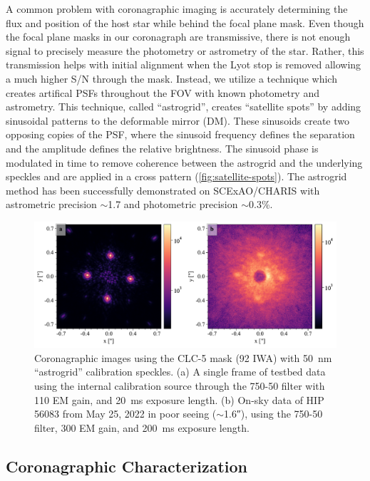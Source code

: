 \documentclass[]{spie}  %
\begin{document}
A common problem with coronagraphic imaging is accurately determining the flux and position of the host star while behind the focal plane mask. Even though the focal plane masks in our coronagraph are transmissive, there is not enough signal to precisely measure the photometry or astrometry of the star. Rather, this transmission helps with initial alignment when the Lyot stop is removed allowing a much higher S/N through the mask. Instead, we utilize a technique which creates artifical PSFs throughout the FOV with known photometry and astrometry. This technique, called ``astrogrid''\cite{sahoo2020}, creates ``satellite spots'' by adding sinusoidal patterns to the deformable mirror (DM). These sinusoids create two opposing copies of the PSF, where the sinusoid frequency defines the separation and the amplitude defines the relative brightness. The sinusoid phase is modulated in time to remove coherence between the astrogrid and the underlying speckles and are applied in a cross pattern (\autoref{fig:satellite-spots}). The astrogrid method has been successfully demonstrated on SCExAO/CHARIS with astrometric precision $\sim$\qty{1.7}{\milliarcsecond} and photometric precision $\sim$0.3\%\cite{currie2020}.

\begin{figure}
   \centering
   \includegraphics[width=\textwidth]{figures/astrogrid_psf}
   \caption{Coronagraphic images using the CLC-5 mask (\qty{92}{\milliarcsecond} IWA) with \qty{50}{\nano\meter} ``astrogrid'' calibration speckles. (a) A single frame of testbed data using the internal calibration source through the 750-50 filter with 110 EM gain, and \qty{20}{\milli\second} exposure length. (b) On-sky data of HIP 56083 from May 25, 2022 in poor seeing ($\sim$\ang{;;1.6}), using the 750-50 filter, 300 EM gain, and \qty{200}{\milli\second} exposure length.}\label{fig:satellite-spots}
\end{figure}

\subsection{Coronagraphic Characterization}
\end{document}
